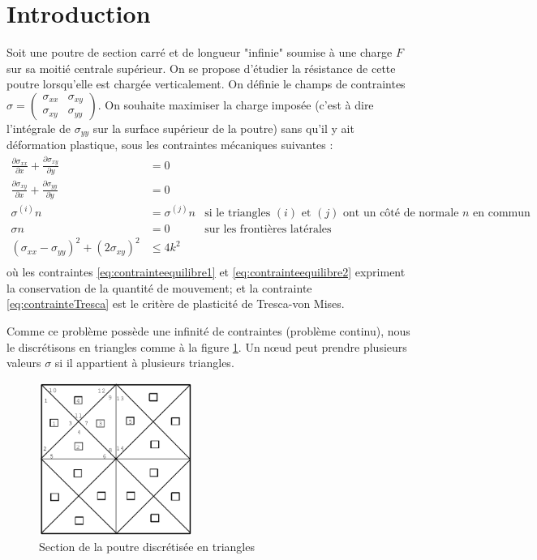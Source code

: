 \thispagestyle{empty}
\section*{Introduction}
Soit une poutre de section carré et de longueur "infinie" soumise à une charge $F$ sur sa moitié centrale supérieur. On se propose d'étudier la résistance de cette poutre lorsqu'elle est chargée verticalement. On définie le champs de contraintes $\sigma = \begin{pmatrix}
\sigma_{xx} & \sigma_{xy}\\
\sigma_{xy} & \sigma_{yy}
\end{pmatrix}$. On souhaite maximiser la charge imposée (c'est à dire l'intégrale de $\sigma_{yy}$ sur la surface supérieur de la poutre) sans qu'il y ait déformation plastique, sous les contraintes mécaniques suivantes : 
\begin{align}
\frac{\partial \sigma_{xx}}{\partial x} + \frac{\partial \sigma_{xy}}{\partial y} &= 0 \label{eq:contrainteequilibre1}\\
\frac{\partial \sigma_{xy}}{\partial x} + \frac{\partial \sigma_{yy}}{\partial y} &= 0\label{eq:contrainteequilibre2}\\
\sigma^{(i)}n &= \sigma^{(j)}n & \text{si le triangles $(i)$ et $(j)$ ont un côté de normale $n$ en commun} \label{eq:contrainteContinuite}\\
\sigma n &= 0 & \text{sur les frontières latérales} \label{eq:contrainteFrontiere} \\
(\sigma_{xx} - \sigma_{yy})^2 + (2 \sigma_{xy})^2 & \leq 4 k^2 \label{eq:contrainteTresca}\\
\end{align}
où les contraintes \eqref{eq:contrainteequilibre1} et \eqref{eq:contrainteequilibre2} expriment la conservation de la quantité de mouvement; et la contrainte \eqref{eq:contrainteTresca} est le critère de plasticité de Tresca-von Mises. 


Comme ce problème possède une infinité de contraintes (problème continu), nous le discrétisons en triangles comme à la figure \ref{fig:discretisation}. Un nœud peut prendre plusieurs valeurs $\sigma$ si il appartient à plusieurs triangles. 

\begin{figure}[h!]
\centering
\includegraphics[height=5cm]{images/discretisation.png}
\caption{Section de la poutre discrétisée en triangles}
\label{fig:discretisation}
\end{figure}


